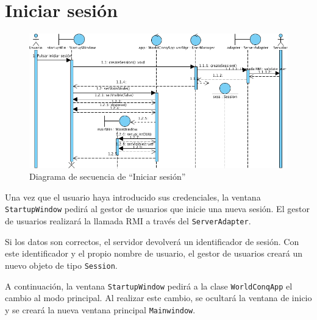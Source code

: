 \section{Iniciar sesión}

\begin{figure}[ht]
\centering
\includegraphics[scale=0.6]{img/ch03devel-login.png}
\caption{Diagrama de secuencia de ``Iniciar sesión''}
\end{figure}

Una vez que el usuario haya introducido sus credenciales, la ventana
\texttt{StartupWindow} pedirá al gestor de usuarios que inicie una nueva
sesión. El gestor de usuarios realizará la llamada RMI a través del
\texttt{ServerAdapter}.

Si los datos son correctos, el servidor devolverá un identificador de sesión.
Con este identificador y el propio nombre de usuario, el gestor de usuarios
creará un nuevo objeto de tipo \texttt{Session}.

A continuación, la ventana \texttt{StartupWindow} pedirá a la clase
\texttt{WorldConqApp} el cambio al modo principal. Al realizar este cambio, se
ocultará la ventana de inicio y se creará la nueva ventana principal
\texttt{Mainwindow}.
